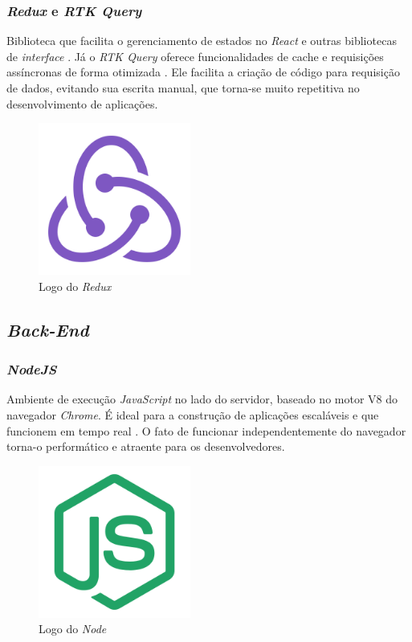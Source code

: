 \subsubsection{\emph{Redux} e \emph{RTK Query}} 
Biblioteca que facilita o gerenciamento de estados no \emph{React} e outras bibliotecas de \emph{interface }\cite{redux}. Já o \emph{RTK Query} oferece funcionalidades de cache e requisições assíncronas de forma otimizada \cite{rtk-query}. Ele facilita a criação de código para requisição de dados, evitando sua escrita manual, que torna-se muito repetitiva no desenvolvimento de aplicações. 

\begin{figure}[htb]
	\centering
	\includegraphics[width=5cm]{cap04-desenvolvimento/images/4-4-1-3-redux-logo.png}
	\caption{Logo do \emph{Redux}}
	\label{fig:redux-logo}
\end{figure}
\FloatBarrier

\subsection{\emph{Back-End}} 

\subsubsection{\emph{NodeJS}} 
Ambiente de execução \emph{JavaScript} no lado do servidor, baseado no motor V8 do navegador \emph{Chrome}. É ideal para a construção de aplicações escaláveis e que funcionem em tempo real \cite{node}. O fato de funcionar independentemente do navegador torna-o performático e atraente para os desenvolvedores.

\begin{figure}[htb]
	\centering
	\includegraphics[width=5cm]{cap04-desenvolvimento/images/4-4-2-1-node-logo.png}
	\caption{Logo do \emph{Node}}
	\label{fig:node-logo}
\end{figure}
\FloatBarrier

